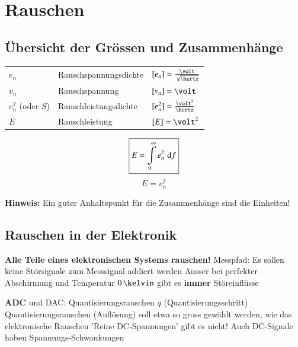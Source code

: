 \section{Rauschen}

\subsection{Übersicht der Grössen und Zusammenhänge}

\begin{minipage}[c]{0.7\columnwidth}
    \renewcommand{\arraystretch}{1.5}
    \begin{tabular}{lll}
        $e_n$               & Rauschspannungsdichte & $[e_n] = \frac{\volt}{\sqrt{\hertz}}$ \\
        $v_n$               & Rauschspannung        & $[v_n] = \volt$ \\
        $e_n^2$ (oder $S$)  & Rauschleistungsdichte & $[e_n^2] = \frac{\volt^2}{\hertz}$ \\
        $E$                 & Rauschleistung        & $[E] = \volt^2$ \\
    \end{tabular}
    \renewcommand{\arraystretch}{1}
\end{minipage}
\hfill
\begin{minipage}[c]{0.28\columnwidth}
    $$ \boxed{ E = \int\limits_{0}^{\infty} e_n^2 \, \mathop{} \! \mathrm{d} f } $$
    $$ \boxed{ E =  v_n^2 } $$
\end{minipage}

\vspace{0.2cm}
\textbf{Hinweis:} Ein guter Anhaltspunkt für die Zusammenhänge sind die Einheiten!


\subsection{Rauschen in der Elektronik}

\begin{outline}
    \1 \textbf{Alle Teile eines elektronischen Systems rauschen!}
    \1 Messpfad: Es sollen keine Störsignale zum Messsignal addiert werden
        \2 Ausser bei perfekter Abschirmung und Temperatur $0 \, \kelvin$ gibt es \textbf{immer} Störeinflüsse
\end{outline}

\vfill\null
\columnbreak

\begin{outline}
    \1 \textbf{ADC} und DAC: Quantisierungsrauschen $q$ (Quantisierungsschritt)
        \2 Quantisierungsrauschen (Auflösung) soll etwa so gross gewählt werden, wie das elektronische Rauschen
    \1 'Reine DC-Spannungen' gibt es nicht!
        \2 Auch DC-Signale haben Spannungs-Schwankungen
\end{outline}


